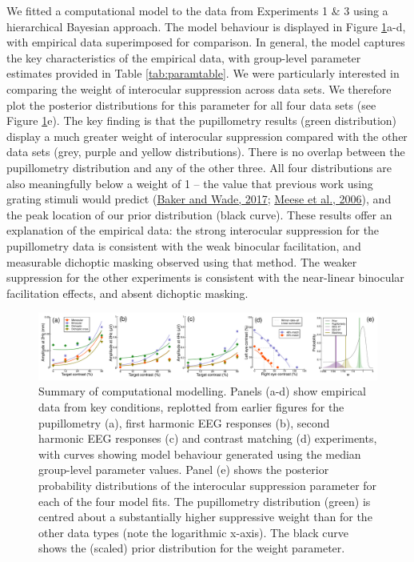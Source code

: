 \documentclass[
]{article}
\begin{document}
We fitted a computational model to the data from Experiments 1 \& 3 using a hierarchical Bayesian approach. The model behaviour is displayed in Figure \ref{fig:modelfigure}a-d, with empirical data superimposed for comparison. In general, the model captures the key characteristics of the empirical data, with group-level parameter estimates provided in Table \ref{tab:paramtable}. We were particularly interested in comparing the weight of interocular suppression across data sets. We therefore plot the posterior distributions for this parameter for all four data sets (see Figure \ref{fig:modelfigure}e). The key finding is that the pupillometry results (green distribution) display a much greater weight of interocular suppression compared with the other data sets (grey, purple and yellow distributions). There is no overlap between the pupillometry distribution and any of the other three. All four distributions are also meaningfully below a weight of 1 -- the value that previous work using grating stimuli would predict (\protect\hyperlink{ref-Baker2017}{Baker and Wade, 2017}; \protect\hyperlink{ref-Meese2006}{Meese et al., 2006}), and the peak location of our prior distribution (black curve). These results offer an explanation of the empirical data: the strong interocular suppression for the pupillometry data is consistent with the weak binocular facilitation, and measurable dichoptic masking observed using that method. The weaker suppression for the other experiments is consistent with the near-linear binocular facilitation effects, and absent dichoptic masking.

\begin{figure}

{\centering \includegraphics{Figures/modelfigure} 

}

\caption{Summary of computational modelling. Panels (a-d) show empirical data from key conditions, replotted from earlier figures for the pupillometry (a), first harmonic EEG responses (b), second harmonic EEG responses (c) and contrast matching (d) experiments, with curves showing model behaviour generated using the median group-level parameter values.  Panel (e) shows the posterior probability distributions of the interocular suppression parameter for each of the four model fits. The pupillometry distribution (green) is centred about a substantially higher suppressive weight than for the other data types (note the logarithmic x-axis). The black curve shows the (scaled) prior distribution for the weight parameter.}\label{fig:modelfigure}
\end{figure}
\end{document}
